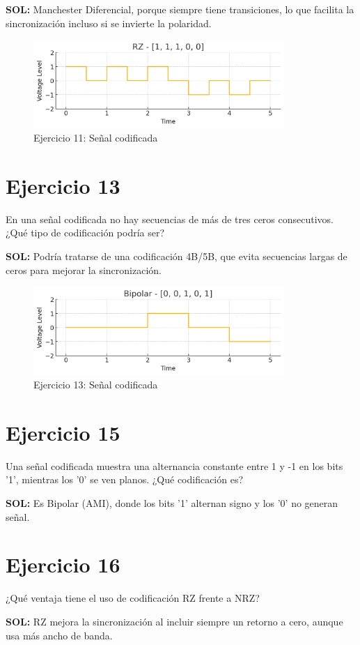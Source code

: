 \documentclass[a4paper,12pt]{article}
\begin{document}
\textbf{SOL:} Manchester Diferencial, porque siempre tiene transiciones, lo que facilita la sincronización incluso si se invierte la polaridad.

\begin{figure}[h!]
\centering
\includegraphics[width=0.85\textwidth]{img/ejercicio_11.png}
\caption{Ejercicio 11: Señal codificada}
\end{figure}
\clearpage




\section*{Ejercicio 13}
En una señal codificada no hay secuencias de más de tres ceros consecutivos. ¿Qué tipo de codificación podría ser?



\textbf{SOL:} Podría tratarse de una codificación 4B/5B, que evita secuencias largas de ceros para mejorar la sincronización.

\begin{figure}[h!]
\centering
\includegraphics[width=0.85\textwidth]{img/ejercicio_13.png}
\caption{Ejercicio 13: Señal codificada}
\end{figure}
\clearpage



\section*{Ejercicio 15}
Una señal codificada muestra una alternancia constante entre 1 y -1 en los bits '1', mientras los '0' se ven planos. ¿Qué codificación es?



\textbf{SOL:} Es Bipolar (AMI), donde los bits '1' alternan signo y los '0' no generan señal.



\section*{Ejercicio 16}
¿Qué ventaja tiene el uso de codificación RZ frente a NRZ?



\textbf{SOL:} RZ mejora la sincronización al incluir siempre un retorno a cero, aunque usa más ancho de banda.
\end{document}
